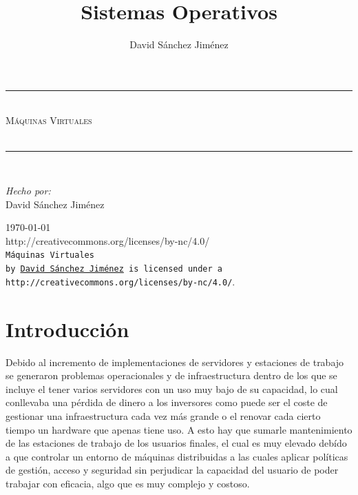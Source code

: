 \documentclass[10pt,a4paper,spanish]{report}
\title{Sistemas Operativos}
\author{David Sánchez Jiménez}
\newcommand{\HRule}{\rule{\linewidth}{0.5mm}} %
\begin{document}
  \begin{titlepage}
    \begin{center}
      \HRule \\[0.8cm]
      \textsc{\huge Máquinas Virtuales\\[0.5cm]}\\[1.6cm]
      \HRule \\[1cm]
      \begin{flushleft}
        \emph{Hecho por:}\\
         David Sánchez Jiménez
      \end{flushleft}
      \vspace{12cm}
      \large{\today}\\
      \vspace{0.5cm}
      {http://creativecommons.org/licenses/by-nc/4.0/}\\[0.5cm]
      \texttt{Máquinas Virtuales\\ by
      \href{mailto:dasaji92@gmail.com}{David Sánchez Jiménez}
      is licensed under a 
      {http://creativecommons.org/licenses/by-nc/4.0/}}.\\[3mm]
    \end{center}
  \end{titlepage}

  \tableofcontents
  \newpage

  \chapter{Introducción}

  \noindent
  Debido al incremento de implementaciones de servidores y estaciones de trabajo se generaron problemas operacionales y de infraestructura dentro de los que se incluye el tener varios servidores con un uso muy bajo de su capacidad, lo cual conllevaba una pérdida de dinero a los inversores como puede ser el coste de gestionar una infraestructura cada vez más grande o el renovar cada cierto tiempo un hardware que apenas tiene uso. A esto hay que sumarle mantenimiento de las estaciones de trabajo de los usuarios finales, el cual es muy elevado debído a que controlar un entorno de máquinas distribuidas a las cuales aplicar políticas de gestión, acceso y seguridad sin perjudicar la capacidad del usuario de poder trabajar con eficacia, algo que es muy complejo y costoso. \\
\end{document}

